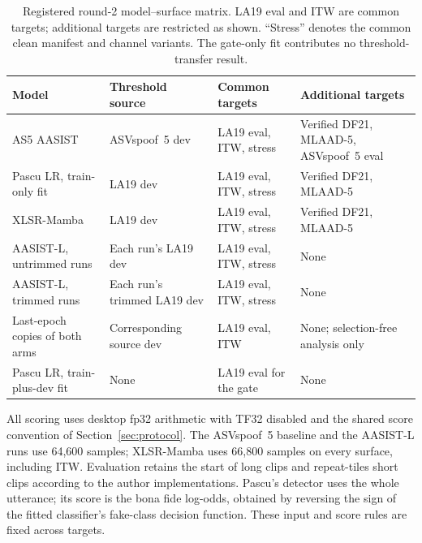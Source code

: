 \begin{table}[!t]
\caption{Registered round-2 model--surface matrix. LA19 eval and ITW are common targets; additional
targets are restricted as shown. ``Stress'' denotes the common clean manifest and channel variants.
The gate-only fit contributes no threshold-transfer result.}
\label{tab:r2matrix}
\centering
\footnotesize
\setlength{\tabcolsep}{4pt}
\begin{tabular}{@{}p{}p{}p{}p{}@{}}
\toprule
Model & Threshold source & Common targets & Additional targets \\
\midrule
AS5 AASIST & ASVspoof~5 dev & LA19 eval, ITW, stress & Verified DF21, MLAAD-5, ASVspoof~5 eval \\
Pascu LR, train-only fit & LA19 dev & LA19 eval, ITW, stress & Verified DF21, MLAAD-5 \\
XLSR-Mamba & LA19 dev & LA19 eval, ITW, stress & Verified DF21, MLAAD-5 \\
AASIST-L, untrimmed runs & Each run's LA19 dev & LA19 eval, ITW, stress & None \\
AASIST-L, trimmed runs & Each run's trimmed LA19 dev & LA19 eval, ITW, stress & None \\
Last-epoch copies of both arms & Corresponding source dev & LA19 eval, ITW & None; selection-free analysis only \\
Pascu LR, train-plus-dev fit & None & LA19 eval for the gate & None \\
\bottomrule
\end{tabular}
\end{table}

All scoring uses desktop fp32 arithmetic with TF32 disabled and the shared score convention of
Section~\ref{sec:protocol}. The ASVspoof~5 baseline and the AASIST-L runs use 64,600 samples;
XLSR-Mamba uses 66,800 samples on every surface, including ITW. Evaluation retains the start of long
clips and repeat-tiles short clips according to the author implementations. Pascu's detector uses
the whole utterance; its score is the bona fide log-odds, obtained by reversing the sign of the fitted
classifier's fake-class decision function. These input and score rules are fixed across targets.

